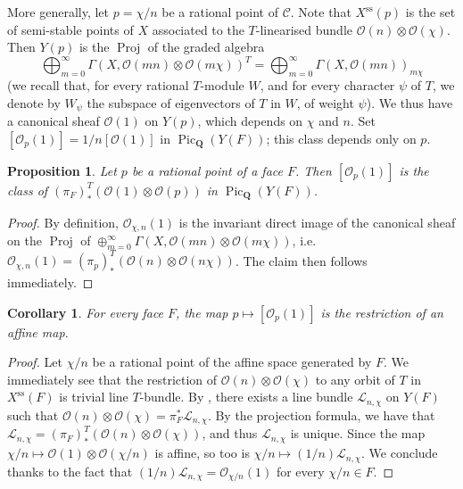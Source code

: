 \documentclass{article}
\theoremstyle{plain}
\newtheorem*{proposition}{Proposition}
\newtheorem*{corollary}{Corollary}
\theoremstyle{definition}
\newcommand{\scr}[1]{{\mathscr{#1}}}
\newcommand{\QQ}{\mathbf{Q}}
\renewcommand{\ss}{\mathrm{ss}}
\DeclareMathOperator{\Pic}{Pic}
\DeclareMathOperator{\Proj}{Proj}
\newcommand{\oldpage}[1]{\marginpar{\footnotesize$\Big\vert$ \textit{p.~#1}}}
\begin{document}
More generally, let $p=\chi/n$ be a rational point of $\mathcal{C}$.
Note that $X^\ss(p)$ is the set of semi-stable points of $X$ associated to the
\oldpage{514}
$T$-linearised bundle $\scr{O}(n)\otimes\scr{O}(\chi)$.
Then $Y(p)$ is the $\Proj$ of the graded algebra
\[
  \bigoplus_{m=0}^\infty \Gamma(X,\scr{O}(mn)\otimes\scr{O}(m\chi))^T = \bigoplus_{m=0}^\infty \Gamma(X,\scr{O}(mn))_{m\chi}
\]
(we recall that, for every rational $T$-module $W$, and for every character $\psi$ of $T$, we denote by $W_\psi$ the subspace of eigenvectors of $T$ in $W$, of weight $\psi$).
We thus have a canonical sheaf $\scr{O}(1)$ on $Y(p)$, which depends on $\chi$ and $n$.
Set $[\scr{O}_p(1)] = 1/n[\scr{O}(1)]$ in $\Pic_\QQ(Y(F))$;
this class depends only on $p$.

\begin{proposition}
  Let $p$ be a rational point of a face $F$.
  Then $[\scr{O}_p(1)]$ is the class of $(\pi_F)_*^T(\scr{O}(1)\otimes\scr{O}(p))$ in $\Pic_\QQ(Y(F))$.
\end{proposition}

\begin{proof}
  By definition, $\scr{O}_{\chi,n}(1)$ is the invariant direct image of the canonical sheaf on the $\Proj$ of $\oplus_{m=0}^\infty\Gamma(X,\scr{O}(mn)\otimes\scr{O}(m\chi))$, i.e. $\scr{O}_{\chi,n}(1) = (\pi_p)_*^T(\scr{O}(n)\otimes\scr{O}(n\chi))$.
  The claim then follows immediately.
\end{proof}

\begin{corollary}
  For every face $F$, the map $p\mapsto[\scr{O}_p(1)]$ is the restriction of an affine map.
\end{corollary}

\begin{proof}
  Let $\chi/n$ be a rational point of the affine space generated by $F$.
  We immediately see that the restriction of $\scr{O}(n)\otimes\scr{O}(\chi)$ to any orbit of $T$ in $X^\ss(F)$ is trivial line $T$-bundle.
  By \cite[Proposition~3]{Kra2}, there exists a line bundle $\scr{L}_{n,\chi}$ on $Y(F)$ such that $\scr{O}(n)\otimes\scr{O}(\chi)=\pi_F^*\scr{L}_{n,\chi}$.
  By the projection formula, we have that $\scr{L}_{n,\chi}=(\pi_F)_*^T(\scr{O}(n)\otimes\scr{O}(\chi))$, and thus $\scr{L}_{n,\chi}$ is unique.
  Since the map $\chi/n\mapsto\scr{O}(1)\otimes\scr{O}(\chi/n)$ is affine, so too is $\chi/n\mapsto(1/n)\scr{L}_{n,\chi}$.
  We conclude thanks to the fact that $(1/n)\scr{L}_{n,\chi}=\scr{O}_{\chi/n}(1)$ for every $\chi/n\in F$.
\end{proof}
\end{document}
